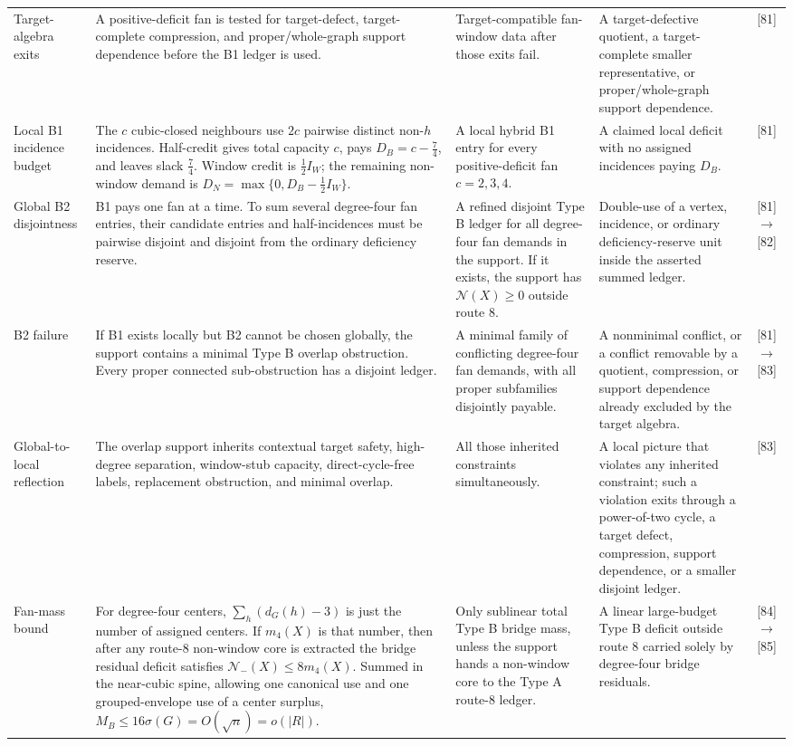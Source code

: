 \documentclass[11pt]{article}
\newcommand{\No}{\mathcal N}
\begin{document}
{\begin{longtable}{L{0.16\textwidth} L{0.19\textwidth} L{0.23\textwidth} L{0.23\textwidth} L{0.10\textwidth}}
\addlinespace
Target-algebra exits
&
A positive-deficit fan is tested for target-defect, target-complete compression,
and proper/whole-graph support dependence before the B1 ledger is used.
&
Target-compatible fan-window data after those exits fail.
&
A target-defective quotient, a target-complete smaller representative, or
proper/whole-graph support dependence.
&
[81]\\
\addlinespace
Local B1 incidence budget
&
The \(c\) cubic-closed neighbours use \(2c\) pairwise distinct non-\(h\)
incidences.  Half-credit gives total capacity \(c\), pays
\(D_B=c-\frac74\), and leaves slack \(\frac74\).  Window credit is
\(\frac12 I_W\); the remaining non-window demand is
\(D_N=\max\{0,D_B-\frac12 I_W\}\).
&
A local hybrid B1 entry for every positive-deficit fan \(c=2,3,4\).
&
A claimed local deficit with no assigned incidences paying
\(D_B\).
&
[81]\\
\addlinespace
Global B2 disjointness
&
B1 pays one fan at a time.  To sum several degree-four fan entries, their
candidate entries and half-incidences must be pairwise disjoint and
disjoint from the ordinary deficiency reserve.
&
A refined disjoint Type B ledger for all degree-four fan demands in the support.
If it exists, the support has \(\No(X)\ge0\) outside route 8.
&
Double-use of a vertex, incidence, or ordinary deficiency-reserve unit
inside the asserted summed ledger.
&
[81]\(\to\)[82]\\
\addlinespace
B2 failure
&
If B1 exists locally but B2 cannot be chosen globally, the support contains a
minimal Type B overlap obstruction.  Every proper connected sub-obstruction has
a disjoint ledger.
&
A minimal family of conflicting degree-four fan demands, with all proper
subfamilies disjointly payable.
&
A nonminimal conflict, or a conflict removable by a quotient, compression, or
support dependence already excluded by the target algebra.
&
[81]\(\to\)[83]\\
\addlinespace
Global-to-local reflection
&
The overlap support inherits contextual target safety, high-degree separation,
window-stub capacity, direct-cycle-free labels, replacement obstruction, and
minimal overlap.
&
All those inherited constraints simultaneously.
&
A local picture that violates any inherited constraint; such a violation exits
through a power-of-two cycle, a target defect, compression, support dependence, or a
smaller disjoint ledger.
&
[83]\\
\addlinespace
Fan-mass bound
&
For degree-four centers, \(\sum_h(d_G(h)-3)\) is just the number of assigned
centers.  If \(m_4(X)\) is that number, then after any route-8 non-window core
is extracted the bridge residual deficit satisfies
\(\No_-(X)\le8m_4(X)\).  Summed in the near-cubic spine, allowing one
canonical use and one grouped-envelope use of a center surplus,
\(M_B\le16\sigma(G)=O(\sqrt n)=o(|R|)\).
&
Only sublinear total Type B bridge mass, unless the support hands a non-window
core to the Type A route-8 ledger.
&
A linear large-budget Type B deficit outside route 8 carried solely by
degree-four bridge residuals.
&
[84]\(\to\)[85]\\
\bottomrule
\end{longtable}}
\end{document}
